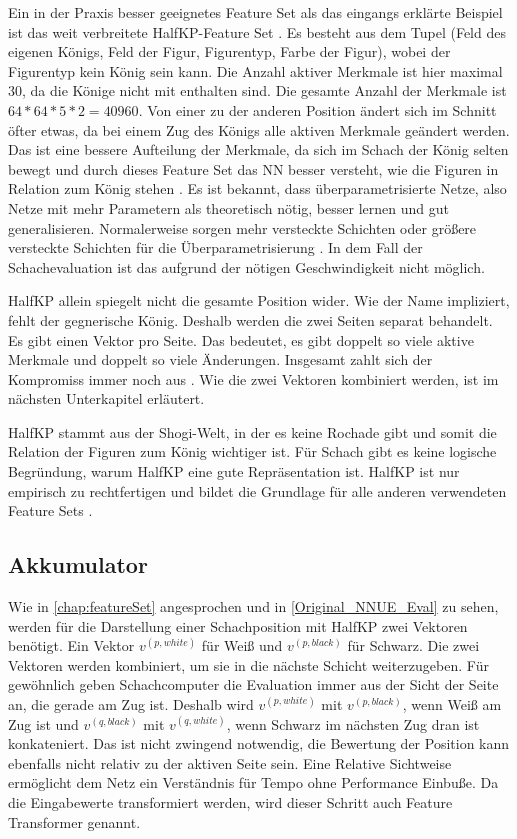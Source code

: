 Ein in der Praxis besser geeignetes Feature Set als das eingangs erklärte Beispiel ist das weit verbreitete HalfKP-Feature Set \cite{YNasu2018,StockfishNNUE}. Es besteht aus dem Tupel (Feld des eigenen Königs, Feld der Figur, Figurentyp, Farbe der Figur), wobei der Figurentyp kein König sein kann. Die Anzahl aktiver Merkmale ist hier maximal 30, da die Könige nicht mit enthalten sind. Die gesamte Anzahl der Merkmale ist $64*64*5*2=40960$. Von einer zu der anderen Position ändert sich im Schnitt öfter etwas, da bei einem Zug des Königs alle aktiven Merkmale geändert werden. Das ist eine bessere Aufteilung der Merkmale, da sich im Schach der König selten bewegt und durch dieses Feature Set das \ac{NN} besser versteht, wie die Figuren in Relation zum König stehen \cite{StockfishNNUE}. Es ist bekannt, dass überparametrisierte Netze, also Netze mit mehr Parametern als theoretisch nötig, besser lernen und gut generalisieren. Normalerweise sorgen mehr versteckte Schichten oder größere versteckte Schichten für die Überparametrisierung \cite{Du2018, allen2019learning}. In dem Fall der Schachevaluation ist das aufgrund der nötigen Geschwindigkeit nicht möglich.

HalfKP allein spiegelt nicht die gesamte Position wider. Wie der Name impliziert, fehlt der gegnerische König. Deshalb werden die zwei Seiten separat behandelt. Es gibt einen Vektor pro Seite. Das bedeutet, es gibt doppelt so viele aktive Merkmale und doppelt so viele Änderungen. Insgesamt zahlt sich der Kompromiss immer noch aus \cite{StockfishNNUE}. Wie die zwei Vektoren kombiniert werden, ist im nächsten Unterkapitel erläutert.

HalfKP stammt aus der Shogi-Welt, in der es keine Rochade gibt und somit die Relation der Figuren zum König wichtiger ist. Für Schach gibt es keine logische Begründung, warum HalfKP eine gute Repräsentation ist. HalfKP ist nur empirisch zu rechtfertigen und bildet die Grundlage für alle anderen verwendeten Feature Sets \cite{StockfishNNUE}.

\subsection{Akkumulator}
\label{chap:accumulator}

Wie in \autoref{chap:featureSet} angesprochen und in \autoref{Original_NNUE_Eval} zu sehen, werden für die Darstellung einer Schachposition mit HalfKP zwei Vektoren benötigt. Ein Vektor $v^{(p,white)}$ für Weiß und $v^{(p,black)}$ für Schwarz. Die zwei Vektoren werden kombiniert, um sie in die nächste Schicht weiterzugeben. Für gewöhnlich geben Schachcomputer die Evaluation immer aus der Sicht der Seite an, die gerade am Zug ist. Deshalb wird $v^{(p,white)}$ mit $v^{(p,black)}$, wenn Weiß am Zug ist und $v^{(q,black)}$ mit $v^{(q,white)}$, wenn Schwarz im nächsten Zug dran ist konkateniert. Das ist nicht zwingend notwendig, die Bewertung der Position kann ebenfalls nicht relativ zu der aktiven Seite sein. Eine Relative Sichtweise ermöglicht dem Netz ein Verständnis für Tempo ohne Performance Einbuße. Da die Eingabewerte transformiert werden, wird dieser Schritt auch Feature Transformer genannt.


